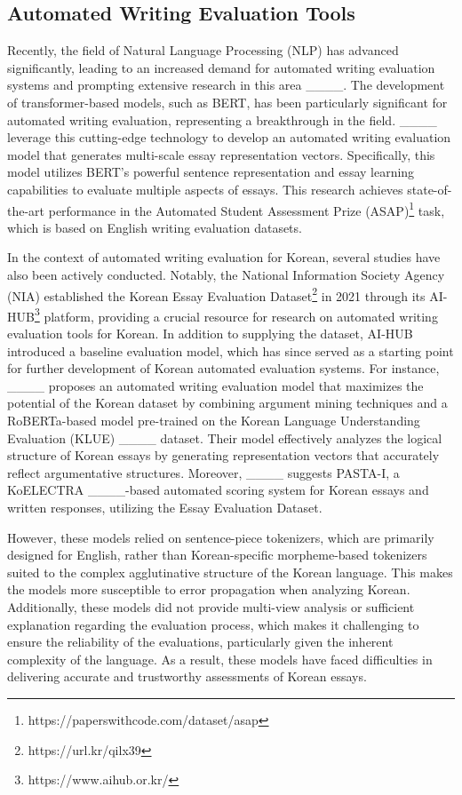 \subsection{Automated Writing Evaluation Tools} 


Recently, the field of Natural Language Processing (NLP) has advanced significantly, leading to an increased demand for automated writing evaluation systems and prompting extensive research in this area ____. The development of transformer-based models, such as BERT, has been particularly significant for automated writing evaluation, representing a breakthrough in the field. ____ leverage this cutting-edge technology to develop an automated writing evaluation model that generates multi-scale essay representation vectors. Specifically, this model utilizes BERT’s powerful sentence representation and essay learning capabilities to evaluate multiple aspects of essays. This research achieves state-of-the-art performance in the Automated Student Assessment Prize (ASAP)\footnote{https://paperswithcode.com/dataset/asap} task, which is based on English writing evaluation datasets.

In the context of automated writing evaluation for Korean, several studies have also been actively conducted. Notably, the National Information Society Agency (NIA) established the Korean \textsf{Essay Evaluation Dataset}\footnote{https://url.kr/qilx39} in 2021 through its \textsf{AI-HUB}\footnote{https://www.aihub.or.kr/} platform, providing a crucial resource for research on automated writing evaluation tools for Korean. In addition to supplying the dataset, AI-HUB introduced a baseline evaluation model, which has since served as a starting point for further development of Korean automated evaluation systems. For instance, ____ proposes an automated writing evaluation model that maximizes the potential of the Korean dataset by combining argument mining techniques and a RoBERTa-based model pre-trained on the Korean Language Understanding Evaluation (KLUE) ____ dataset. Their model effectively analyzes the logical structure of Korean essays by generating representation vectors that accurately reflect argumentative structures. Moreover, ____ suggests \textsf{PASTA-I}, a KoELECTRA ____-based automated scoring system for Korean essays and written responses, utilizing the \textsf{Essay Evaluation Dataset}.

However, these models relied on sentence-piece tokenizers, which are primarily designed for English, rather than Korean-specific morpheme-based tokenizers suited to the complex agglutinative structure of the Korean language. This makes the models more susceptible to error propagation when analyzing Korean. Additionally, these models did not provide multi-view analysis or sufficient explanation regarding the evaluation process, which makes it challenging to ensure the reliability of the evaluations, particularly given the inherent complexity of the language. As a result, these models have faced difficulties in delivering accurate and trustworthy assessments of Korean essays.